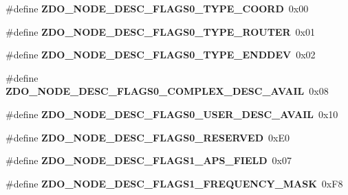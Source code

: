 \begin{DoxyCompactItemize}
\item 
\hypertarget{group__zdo_ga045e2e1260aedda9d893eda672ff2759}{\#define {\bfseries Z\-D\-O\-\_\-\-N\-O\-D\-E\-\_\-\-D\-E\-S\-C\-\_\-\-F\-L\-A\-G\-S0\-\_\-\-T\-Y\-P\-E\-\_\-\-C\-O\-O\-R\-D}~0x00}\label{group__zdo_ga045e2e1260aedda9d893eda672ff2759}

\item 
\hypertarget{group__zdo_ga638960e6443cf99ea580bda38247de6a}{\#define {\bfseries Z\-D\-O\-\_\-\-N\-O\-D\-E\-\_\-\-D\-E\-S\-C\-\_\-\-F\-L\-A\-G\-S0\-\_\-\-T\-Y\-P\-E\-\_\-\-R\-O\-U\-T\-E\-R}~0x01}\label{group__zdo_ga638960e6443cf99ea580bda38247de6a}

\item 
\hypertarget{group__zdo_ga73b2f81177df4b568597a7937903cdda}{\#define {\bfseries Z\-D\-O\-\_\-\-N\-O\-D\-E\-\_\-\-D\-E\-S\-C\-\_\-\-F\-L\-A\-G\-S0\-\_\-\-T\-Y\-P\-E\-\_\-\-E\-N\-D\-D\-E\-V}~0x02}\label{group__zdo_ga73b2f81177df4b568597a7937903cdda}

\item 
\hypertarget{group__zdo_gaccb1d140d777a88fcb71f107adcf4c0b}{\#define {\bfseries Z\-D\-O\-\_\-\-N\-O\-D\-E\-\_\-\-D\-E\-S\-C\-\_\-\-F\-L\-A\-G\-S0\-\_\-\-C\-O\-M\-P\-L\-E\-X\-\_\-\-D\-E\-S\-C\-\_\-\-A\-V\-A\-I\-L}~0x08}\label{group__zdo_gaccb1d140d777a88fcb71f107adcf4c0b}

\item 
\hypertarget{group__zdo_ga721ea4088a875ddddda53d88e0f2c1c4}{\#define {\bfseries Z\-D\-O\-\_\-\-N\-O\-D\-E\-\_\-\-D\-E\-S\-C\-\_\-\-F\-L\-A\-G\-S0\-\_\-\-U\-S\-E\-R\-\_\-\-D\-E\-S\-C\-\_\-\-A\-V\-A\-I\-L}~0x10}\label{group__zdo_ga721ea4088a875ddddda53d88e0f2c1c4}

\item 
\hypertarget{group__zdo_ga95e4053f203577f2b7b07d25bb7857a6}{\#define {\bfseries Z\-D\-O\-\_\-\-N\-O\-D\-E\-\_\-\-D\-E\-S\-C\-\_\-\-F\-L\-A\-G\-S0\-\_\-\-R\-E\-S\-E\-R\-V\-E\-D}~0x\-E0}\label{group__zdo_ga95e4053f203577f2b7b07d25bb7857a6}

\item 
\hypertarget{group__zdo_ga4bf942f7cd1215c7981577a55b05bed0}{\#define {\bfseries Z\-D\-O\-\_\-\-N\-O\-D\-E\-\_\-\-D\-E\-S\-C\-\_\-\-F\-L\-A\-G\-S1\-\_\-\-A\-P\-S\-\_\-\-F\-I\-E\-L\-D}~0x07}\label{group__zdo_ga4bf942f7cd1215c7981577a55b05bed0}

\item 
\hypertarget{group__zdo_ga55dcb5f623fc0cb8260955ab905256a9}{\#define {\bfseries Z\-D\-O\-\_\-\-N\-O\-D\-E\-\_\-\-D\-E\-S\-C\-\_\-\-F\-L\-A\-G\-S1\-\_\-\-F\-R\-E\-Q\-U\-E\-N\-C\-Y\-\_\-\-M\-A\-S\-K}~0x\-F8}\label{group__zdo_ga55dcb5f623fc0cb8260955ab905256a9}


\end{DoxyCompactItemize}
